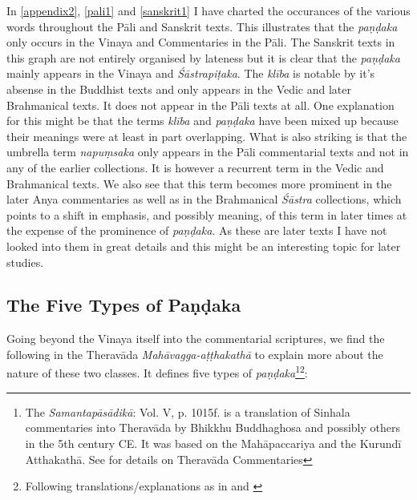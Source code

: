 In \ref{appendix2}, \ref{pali1} and \ref{sanskrit1} I have charted the occurances of the various words throughout the Pāli and Sanskrit texts. This illustrates that the {\em paṇḍaka} only occurs in the Vinaya and Commentaries in the Pāli. The Sanskrit texts in this graph are not entirely organised by lateness but it is clear that the {\em paṇḍaka} mainly appears in the Vinaya and {\em Śāstrapiṭaka}. The {\em klība} is notable by it's absense in the Buddhist texts and only appears in the Vedic and later Brahmanical texts. It does not appear in the Pāli texts at all. One explanation for this might be that the terms {\em klība} and {\em paṇḍaka} have been mixed up because their meanings were at least in part overlapping. What is also striking is that the umbrella term {\em napuṃsaka} only appears in the Pāli commentarial texts and not in any of the earlier collections. It is however a recurrent term in the Vedic and Brahmanical texts. We also see that this term becomes more prominent in the later Anya commentaries as well as in the Brahmanical {\em Śāstra} collections, which points to a shift in emphasis, and possibly meaning, of this term in later times at the expense of the prominence of {\em paṇḍaka}. As these are later texts I have not looked into them in great details and this might be an interesting topic for later studies.


\subsection{The Five Types of Paṇḍaka}
Going beyond the Vinaya itself into the commentarial scriptures, we find the following in the Theravāda {\em Mahāvagga-aṭṭhakathā} to explain more about the nature of these two classes. It defines five types of {\em paṇḍaka}\footnote{The {\em Samantapāsādikā}: Vol. V, p. 1015f. is a translation of Sinhala commentaries into Theravāda by Bhikkhu Buddhaghosa and possibly others in the 5th century CE. It was based on the Mahāpaccariya and the Kurundī Atthakathā. See \cite{goonesekere} for details on Theravāda Commentaries}\footnote{Following translations/explanations as in \cite{bomhard} and \cite{thanissaro}}:

